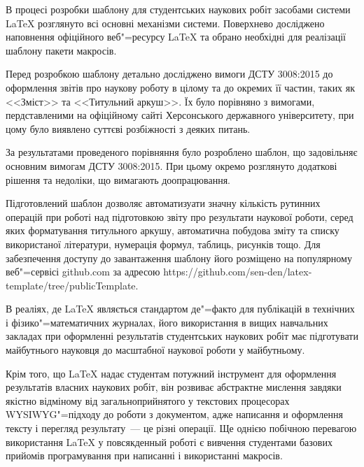 
В процесі розробки шаблону для студентських наукових робіт засобами системи \LaTeX{} розглянуто всі основні механізми системи. Поверхнево досліджено наповнення офіційного веб"=ресурсу \LaTeX{} \cite{www:ctan} та обрано необхідні для реалізації шаблону пакети макросів.

Перед розробкою шаблону детально досліджено вимоги ДСТУ 3008:2015 до оформлення звітів про наукову роботу в цілому та до окремих її частин, таких як <<Зміст>> та <<Титульний аркуш>>. Їх було порівняно з вимогами, пердставленими на офіційному сайті Херсонського державного університету, при цому було виявлено суттєві розбіжності з деяких питань.

За результатами проведеного порівняння було розроблено шаблон, що задовільняє основним вимогам ДСТУ 3008:2015. При цьому окремо розглянуто додаткові рішення та недоліки, що вимагають доопрацювання.

Підготовлений шаблон дозволяє автоматизуати значну кількість рутинних операцій при роботі над підготовкою звіту про результати наукової роботи, серед яких форматування титульного аркушу, автоматична побудова зміту та списку використаної літератури, нумерація формул, таблиць, рисунків тощо. Для забезпечення доступу до завантаження шаблону його розміщено на популярному веб"=сервісі github.com за адресою https://github.com/sen-den/latex-template/tree/publicTemplate.

В реаліях, де \LaTeX{} являється стандартом де"=факто для публікацій в технічних і фізико"=математичних журналах, його використання в вищих навчальних закладах при оформленні результатів студентських наукових робіт має підготувати майбутнього науковця до масштабної наукової роботи у майбутньому.

Крім того, що \LaTeX{} надає студентам потужний інструмент для оформлення результатів власних наукових робіт, він розвиває абстрактне мислення завдяки якістно відміному від загальноприйнятого у текстових процесорах WYSIWYG"=підходу до роботи з документом, адже написання и оформлення тексту і перегляд результату~--- це різні операції. Ще однією побічною перевагою використання \LaTeX{} у повсякденный роботі є вивчення студентами базових прийомів програмування при написанні і використанні макросів.

